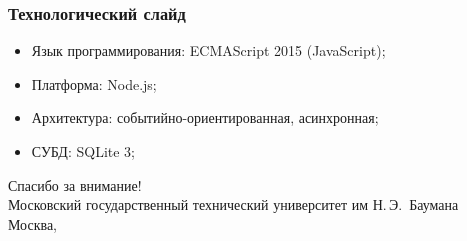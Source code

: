 \documentclass[hyperref={unicode}, 14pt]{beamer}
\begin{document}
\begin{frame}
  \frametitle{Технологический слайд}

  \begin{block}{}
    \begin{itemize}
      \item Язык программирования: ECMAScript 2015 (JavaScript);
      \item Платформа: Node.js;
      \item Архитектура: событийно-ориентированная, асинхронная;
      \item СУБД: SQLite 3;
    \end{itemize}
  \end{block}
\end{frame}

\begin{frame}[plain]
  \centering
  {\Huge Спасибо за внимание!}\\[2cm]

  {\Large Московский государственный технический университет им Н.\,Э.~Баумана}\\[1cm]

  {\large Москва, \the\year}
\end{frame}
\end{document}
